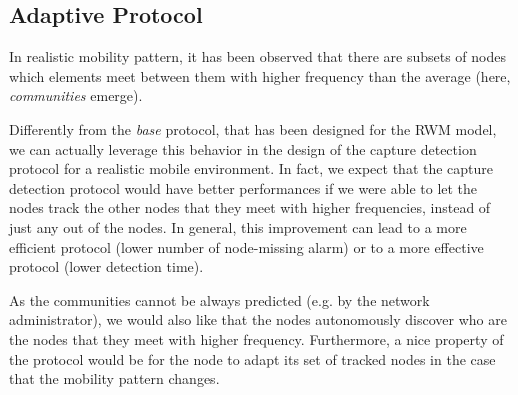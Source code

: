 \documentclass{IEEEconf}
\begin{document}
\subsection{Adaptive Protocol}
\label{adaptiveProtocol}

In
realistic mobility pattern, it has been observed \cite{CDGMM:WWIC:TheQuest} that there are subsets of nodes which elements meet between them with higher frequency than the average (here,
\textit{communities} emerge).

Differently from the \textit{base} protocol, that has been designed for the RWM model, we can actually leverage this behavior in the design of the capture detection protocol for a realistic mobile environment.
In fact, we expect that the capture detection protocol would have better performances if we were able to let the nodes track the other nodes that they meet with higher frequencies, instead of just any  out of the  nodes.
In general, this improvement can lead to a more efficient protocol (lower number of node-missing alarm) or to a more effective protocol (lower detection time).

As the communities cannot be always predicted (e.g. by the network administrator), we would also like that the nodes autonomously discover who are the nodes that they meet with higher frequency.
Furthermore, a nice property of the protocol would be for the node to adapt its set of tracked nodes in the case that the mobility pattern changes.
\end{document}
